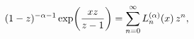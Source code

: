 \[(1-z)^{-\alpha-1}\mathop{\exp\/}\nolimits\!\left(\frac{xz}{z-1}\right)=\sum_{n%
=0}^{\infty}\mathop{L^{(\alpha)}_{n}\/}\nolimits\!\left(x\right)z^{n},\]